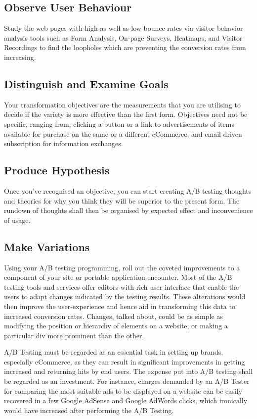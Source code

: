 \subsection{Observe User Behaviour}
Study the web pages with high as well as low bounce rates via visitor behavior analysis tools such as Form Analysis, On-page Surveys, Heatmaps, and Visitor Recordings to find the loopholes which are preventing the conversion rates from increasing.  

\subsection{Distinguish and Examine Goals}
Your transformation objectives are the measurements that you are utilising to decide if the variety is more effective than the first form. Objectives need not be specific, ranging from, clicking a button or a link to advertisements of items available for purchase on the same or a different eCommerce, and email driven subscription for information exchanges.

\subsection{Produce Hypothesis}
Once you've recognised an objective, you can start creating A/B testing thoughts and theories for why you think they will be superior to the present form. The rundown of thoughts shall then be organised by expected effect and inconvenience of usage.

\subsection{Make Variations}
Using your A/B testing programming, roll out the coveted improvements to a component of your site or portable application encounter. Most of the A/B testing tools and services offer editors with rich user-interface that enable the users to adapt changes indicated by the testing results. These alterations would then improve the user-experience and hence aid in transforming this data to increased conversion rates. Changes, talked about, could be as simple as modifying the position or hierarchy of elements on a website, or making a particular div more prominent than the other.

A/B Testing must be regarded as an essential task in setting up brands, especially eCommerce, as they can result in significant improvements in getting increased and returning hits by end users. The expense put into A/B testing shall be regarded as an investment. For instance, charges demanded by an A/B Tester for comparing the most suitable ads to be displayed on a website can be easily recovered in a few Google AdSense and Google AdWords clicks, which ironically would have increased after performing the A/B Testing.\par

